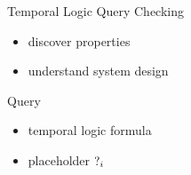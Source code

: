 
\begin{frame}{Temporal Logic Query Checking}
  \begin{itemize}
    \item discover properties
    \item understand system design
  \end{itemize}

  \vfill

  \begin{block}{Query}
    \begin{itemize}
      \item temporal logic formula
      \item placeholder $\operatorname{?}_i$
    \end{itemize}
  \end{block}
\end{frame}


%  
